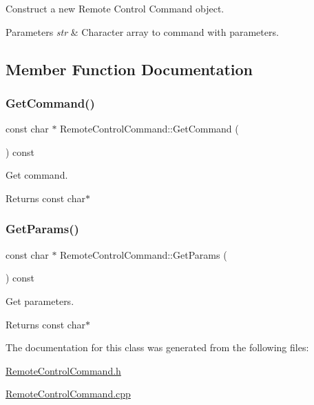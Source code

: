 Construct a new Remote Control Command object. 


\begin{DoxyParams}{Parameters}
{\em str} & Character array to command with parameters. \\
\hline
\end{DoxyParams}


\subsection{Member Function Documentation}
\mbox{\label{classRemoteControlCommand_a3ef6fc2ec020b5b1c7b7a9188a0848d8}} 
\subsubsection{\texorpdfstring{GetCommand()}{GetCommand()}}
{\footnotesize\ttfamily const char $\ast$ Remote\+Control\+Command\+::\+Get\+Command (\begin{DoxyParamCaption}{ }\end{DoxyParamCaption}) const}



Get command. 

\begin{DoxyReturn}{Returns}
const char$\ast$ 
\end{DoxyReturn}
\mbox{\label{classRemoteControlCommand_a292b01c818d36dd6f1e8b8f1b3dc58ae}} 
\subsubsection{\texorpdfstring{GetParams()}{GetParams()}}
{\footnotesize\ttfamily const char $\ast$ Remote\+Control\+Command\+::\+Get\+Params (\begin{DoxyParamCaption}{ }\end{DoxyParamCaption}) const}



Get parameters. 

\begin{DoxyReturn}{Returns}
const char$\ast$ 
\end{DoxyReturn}


The documentation for this class was generated from the following files\+:\begin{DoxyCompactItemize}
\item 
\mbox{\hyperlink{RemoteControlCommand_8h}{Remote\+Control\+Command.\+h}}\item 
\mbox{\hyperlink{RemoteControlCommand_8cpp}{Remote\+Control\+Command.\+cpp}}\end{DoxyCompactItemize}
